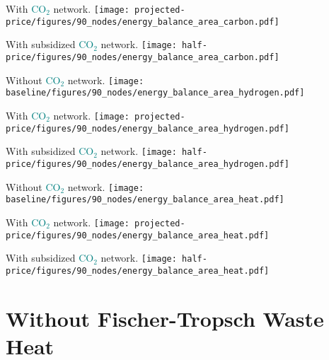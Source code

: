 \documentclass[12pt, aspectratio=169]{beamer}
\newcommand{\carbon}{\textcolor{teal}{CO$_2$}}
\begin{document}
\begin{frame}
    \begin{center}
    With \carbon{} network.
    \texttt{[image: projected-price/figures/90\_nodes/energy\_balance\_area\_carbon.pdf]}
    \end{center}
\end{frame}


\begin{frame}
    \begin{center}
    With subsidized \carbon{} network.
    \texttt{[image: half-price/figures/90\_nodes/energy\_balance\_area\_carbon.pdf]}
    \end{center}
\end{frame}


\begin{frame}
    \begin{center}
    Without \carbon{} network.
    \texttt{[image: baseline/figures/90\_nodes/energy\_balance\_area\_hydrogen.pdf]}
    \end{center}
\end{frame}


\begin{frame}
    \begin{center}
    With \carbon{} network.
    \texttt{[image: projected-price/figures/90\_nodes/energy\_balance\_area\_hydrogen.pdf]}
    \end{center}
\end{frame}


\begin{frame}
    \begin{center}
    With subsidized \carbon{} network.
    \texttt{[image: half-price/figures/90\_nodes/energy\_balance\_area\_hydrogen.pdf]}
    \end{center}
\end{frame}


\begin{frame}
    \begin{center}
    Without \carbon{} network.
    \texttt{[image: baseline/figures/90\_nodes/energy\_balance\_area\_heat.pdf]}
    \end{center}
\end{frame}


\begin{frame}
    \begin{center}
    With \carbon{} network.
    \texttt{[image: projected-price/figures/90\_nodes/energy\_balance\_area\_heat.pdf]}
    \end{center}
\end{frame}


\begin{frame}
    \begin{center}
    With subsidized \carbon{} network.
    \texttt{[image: half-price/figures/90\_nodes/energy\_balance\_area\_heat.pdf]}
    \end{center}
\end{frame}

\section*{Without Fischer-Tropsch Waste Heat}
\end{document}
